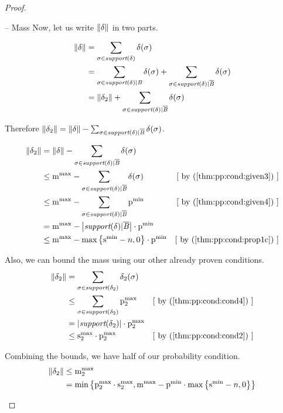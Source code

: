 \begin{proof}
\begin{subproof}{ -- Mass}
Now, let us write $ \mathord{\parallel}\delta\mathord{\parallel} $ in two parts.

\begin{align*}
\mathord{\parallel}\delta\mathord{\parallel} & = \sum_{\sigma \in \textit{support}(\delta)} \delta(\sigma) \\
               & = \sum_{\sigma \in \textit{support}(\delta) | \mathit{B}} \delta(\sigma)
               + \sum_{\sigma \in \textit{support}(\delta) | \overline{\mathit{B}}} \delta(\sigma) \\
               & = \mathord{\parallel}\delta_2\mathord{\parallel} + \sum_{\sigma \in \textit{support}(\delta) | \overline{\mathit{B}}} \delta(\sigma)
\end{align*}

Therefore $ \mathord{\parallel}\delta_2\mathord{\parallel} = \mathord{\parallel}\delta\mathord{\parallel}
- \sum_{\sigma \in \textit{support}(\delta) | \overline{\mathit{B}}} \delta(\sigma) $.

\begin{align*}
\pmass{\delta_2}
& = \pmass{\delta} - \sum_{\sigma \in \supout} \delta(\sigma) \\
& \leq \mmax{} - \sum_{\sigma \in \supout} \delta(\sigma)
& \mathstep{by \cnumref{thm:pp:cond:given3}} \\
& \leq \mmax{} - \sum_{\sigma \in \supout} \pmin{}
 & \mathstep{by \cnumref{thm:pp:cond:given4}} \\
& = \mmax{} - \setsize{\supout} \cdot \pmin{} \\
& \leq \mmax{} - \maxparen{\smin{} - n, 0} \cdot \pmin{}
& \mathstep{by \cnumref{thm:pp:cond:prop1c}}
\end{align*}

Also, we can bound the mass using our other already proven conditions.
\begin{align*}
\pmass{\delta_2} & = \sum_{\sigma \in \supdn} \delta_2(\sigma) \\
                 & \leq \sum_{\sigma \in \supdn} \pmax{2}
                 & \mathstep{by \cnumref{thm:pp:cond:cond4}} \\
                 & = \setsize{\supdn} \cdot \pmax{2} \\
                 & \leq \smax{2} \cdot \pmax{2} & \mathstep{by \cnumref{thm:pp:cond:cond2}}
\end{align*}

Combining the bounds, we have half of our probability condition.
\begin{align*}
\mathord{\parallel}\delta_2\mathord{\parallel} & \leq \mathrm{m}^\mathrm{max}_{2} \\
& = \min\left\{ \mathrm{p}^\mathrm{max}_{2} \cdot \mathrm{s}^\mathrm{max}_{2}, \mathrm{m}^\mathrm{max}_{} - \mathrm{p}^\mathrm{min}_{} \cdot \max\left\{ \mathrm{s}^\mathrm{min}_{} - n, 0  \right\} \right\}
\end{align*}


\end{subproof}
\end{proof}
